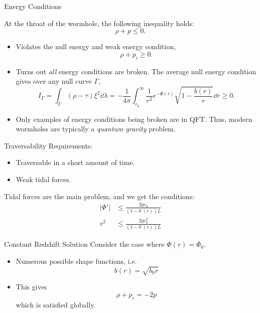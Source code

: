 \documentclass[aspectratio=169,xcolor=dvipsnames]{beamer}
\begin{document}
\begin{frame}{Energy Conditions}
    \begin{proposition}
        At the throat of the wormhole, the following inequality holds:
        \begin{equation}
            \rho + p \le 0.
        \end{equation}
    \end{proposition}
    \begin{itemize}
        \item Violates the null energy and weak energy condition,
        \begin{equation}
            \rho + p_i \ge 0.
        \end{equation}
        \item Turns out \textit{all} energy conditions are broken. The average null energy condition gives over any null curve $\Gamma,$ 
        \begin{equation}
            I_{\Gamma} = \int_{\Gamma} (\rho-\tau)\xi^2 \dd{\lambda} = -\frac{1}{4\pi}\int_{r_0}^{\infty}\frac{1}{r^2}e^{-\Phi(r)}\sqrt{1-\frac{b(r)}{r}}\dd{r}\ge 0.
        \end{equation}
        \item Only examples of energy conditions being broken are in QFT. Thus, modern wormholes are typically a \textit{quantum gravity} problem.
    \end{itemize}
\end{frame}

\begin{frame}{Traversability}
    Requirements:
    \begin{itemize}
        \item Traversable in a short amount of time.
        \item Weak tidal forces.
    \end{itemize}
    Tidal forces are the main problem, and we get the conditions:
    \begin{align*}
        |\Phi'| &\le \frac{2gr_0}{(1-b'(r))L} \\
        v^2 &\le \frac{2gr_0^2}{(1-b'(r))L}
    \end{align*}
\end{frame}

\begin{frame}{Constant Redshift Solution}
    Consider the case where $\Phi(r) = \Phi_0.$
    \begin{itemize}
        \item Numerous possible shape functions, i.e.
        \begin{equation}
            b(r) = \sqrt{b_0r}
        \end{equation}
        \item This gives 
        \begin{equation}
            \rho + p_r = -2p
        \end{equation}
        which is satisfied globally.
    \end{itemize}
\end{frame}
\end{document}

